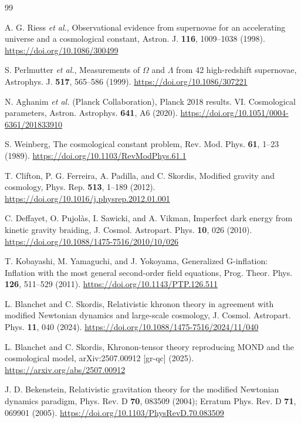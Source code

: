 \documentclass[aps,prd,reprint,onecolumn,notitlepage,nofootinbib,longbibliography,floatfix]{revtex4-2}
\theoremstyle{scstyle}
\theoremstyle{definition}
\theoremstyle{remark}
\begin{document}
\begin{thebibliography}{99}

A. G. Riess \textit{et al.}, Observational evidence from supernovae for an accelerating universe and a cosmological constant, Astron. J. \textbf{116}, 1009--1038 (1998). \url{https://doi.org/10.1086/300499}

S. Perlmutter \textit{et al.}, Measurements of $\Omega$ and $\Lambda$ from 42 high-redshift supernovae, Astrophys. J. \textbf{517}, 565--586 (1999). \url{https://doi.org/10.1086/307221}

N. Aghanim \textit{et al.} (Planck Collaboration), Planck 2018 results. VI. Cosmological parameters, Astron. Astrophys. \textbf{641}, A6 (2020). \url{https://doi.org/10.1051/0004-6361/201833910}

S. Weinberg, The cosmological constant problem, Rev. Mod. Phys. \textbf{61}, 1--23 (1989). \url{https://doi.org/10.1103/RevModPhys.61.1}

T. Clifton, P. G. Ferreira, A. Padilla, and C. Skordis, Modified gravity and cosmology, Phys. Rep. \textbf{513}, 1--189 (2012). \url{https://doi.org/10.1016/j.physrep.2012.01.001}

C. Deffayet, O. Pujol\`as, I. Sawicki, and A. Vikman, Imperfect dark energy from kinetic gravity braiding, J. Cosmol. Astropart. Phys. \textbf{10}, 026 (2010). \url{https://doi.org/10.1088/1475-7516/2010/10/026}

T. Kobayashi, M. Yamaguchi, and J. Yokoyama, Generalized G-inflation: Inflation with the most general second-order field equations, Prog. Theor. Phys. \textbf{126}, 511--529 (2011). \url{https://doi.org/10.1143/PTP.126.511}

L. Blanchet and C. Skordis, Relativistic khronon theory in agreement with modified Newtonian dynamics and large-scale cosmology, J. Cosmol. Astropart. Phys. \textbf{11}, 040 (2024). \url{https://doi.org/10.1088/1475-7516/2024/11/040}

L. Blanchet and C. Skordis, Khronon-tensor theory reproducing MOND and the cosmological model, arXiv:2507.00912 [gr-qc] (2025). \url{https://arxiv.org/abs/2507.00912}

J. D. Bekenstein, Relativistic gravitation theory for the modified Newtonian dynamics paradigm, Phys. Rev. D \textbf{70}, 083509 (2004); Erratum Phys. Rev. D \textbf{71}, 069901 (2005). \url{https://doi.org/10.1103/PhysRevD.70.083509}


\end{thebibliography}
\end{document}
